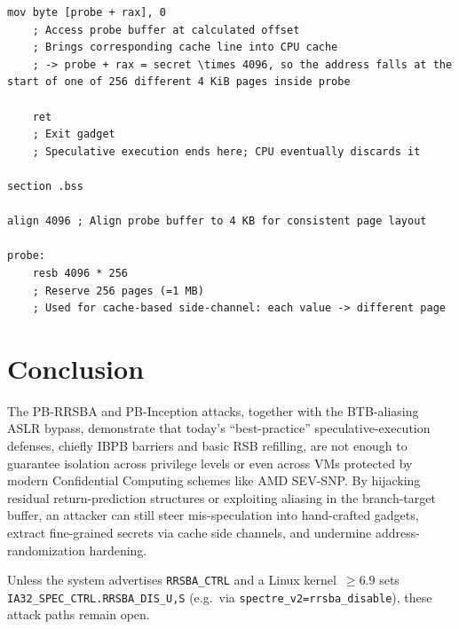 \documentclass[11pt,a4paper]{article}
\begin{document}
\begin{lstlisting}[caption={\texttt{attacker\_rrsba\_injection.asm}}, label={lst:rrsba-injection}]
    mov byte [probe + rax], 0
    ; Access probe buffer at calculated offset
    ; Brings corresponding cache line into CPU cache
    ; -> probe + rax = secret \times 4096, so the address falls at the start of one of 256 different 4 KiB pages inside probe

    ret
    ; Exit gadget
    ; Speculative execution ends here; CPU eventually discards it

section .bss

align 4096 ; Align probe buffer to 4 KB for consistent page layout

probe:
    resb 4096 * 256
    ; Reserve 256 pages (=1 MB)
    ; Used for cache-based side-channel: each value -> different page
\end{lstlisting}

\section{Conclusion}
The PB-RRSBA and PB-Inception attacks, together with the BTB-aliasing ASLR bypass, demonstrate that today’s “best-practice” speculative-execution defenses, chiefly IBPB barriers and basic RSB refilling, are not enough to guarantee isolation across privilege levels or even across VMs protected by modern Confidential Computing schemes like AMD SEV-SNP. By hijacking residual return-prediction structures or exploiting aliasing in the branch-target buffer, an attacker can still steer mis-speculation into hand-crafted gadgets, extract fine-grained secrets via cache side channels, and undermine address-randomization hardening.

Unless the system advertises \texttt{RRSBA\_CTRL} and a Linux kernel~$\ge 6.9$ sets \\\texttt{IA32\_SPEC\_CTRL.RRSBA\_DIS\_{U,S}} (e.g.\ via \texttt{spectre\_v2=rrsba\_disable}), these attack paths remain open.


\end{document}
